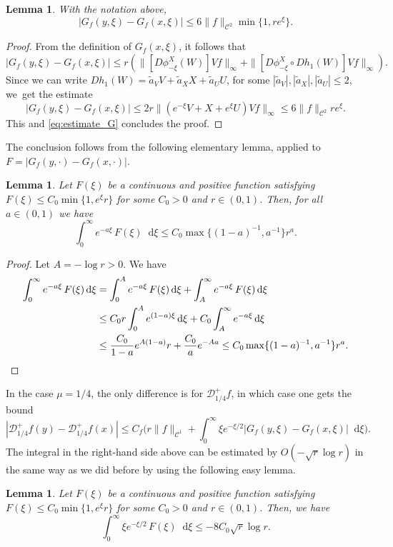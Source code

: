 \documentclass[JEP,XML,SOM,NoEqCountersInSection,Unicode,published]{cedram}
\newcommand*{\diff}{\mathop{}\!\mathrm{d}}
\newtheorem {lemma}[theorem]{Lemma}
\theoremstyle{definition}
\begin{document}
\begin{lemma}
With the notation above,
\[
|G_{f}(y,\xi) -G_{f}(x,\xi) |\leq 6 \|f\|_{\mathscr{C}^2} \min\{1, r e^\xi\}.
\]
\end{lemma}
\begin{proof}
From the definition of $G_{f}(x,\xi)$, it follows that
\[
|G_{f}(y,\xi) -G_{f}(x,\xi) |\leq r (\|[D\phi^X_{-\xi}(W) ] Vf \|_\infty + \|[D\phi^X_{-\xi} \circ Dh_1 (W)] Vf \|_\infty).
\]
Since we can write $Dh_1 (W) = {\widetilde a_V}V+{\widetilde a_X}X+{\widetilde a_U}U$, for some $|{\widetilde a_V}|, |{\widetilde a_X}|, |{\widetilde a_U}|\leq 2$, we~get the estimate
\[
|G_{f}(y,\xi) -G_{f}(x,\xi) |\leq 2 r \|(e^{-\xi}V + X + e^{\xi}U)Vf\|_\infty \leq 6 \|f\|_{\mathscr{C}^2} r e^\xi.
\]
This and \eqref{eq:estimate_G} concludes the proof.
\end{proof}

The conclusion follows from the following elementary lemma, applied to $F=|G_{f}(y, \cdot) - G_{f}(x, \cdot)|$.

\begin{lemma}
Let $F(\xi)$ be a continuous and positive function satisfying $F(\xi) \leq C_0 \min\{ 1, e^\xi r\}$ for some $C_0>0$ and $r \in (0,1)$. Then, for all $a\in (0,1)$ we have
\[
\int_0^\infty e^{-a \xi} \, F(\xi) \diff \xi \leq C_0 \max\{(1-a)^{-1}, a^{-1}\} r^a.
\]
\end{lemma}
\begin{proof}
Let $A = -\log r >0$. We have
\begin{align*}
\int_0^\infty e^{-a \xi} \, F(\xi) \diff \xi &= \int_0^A e^{-a \xi} \, F(\xi) \diff \xi + \int_A^{\infty} e^{-a \xi} \, F(\xi) \diff \xi \\
& \leq C_0 r \int_0^A e^{(1-a) \xi} \diff \xi + C_0 \int_A^{\infty} e^{-a \xi} \diff \xi \\
&\leq \frac{C_0}{1-a}e^{A(1-a)} r + \frac{C_0}{a} e^{-Aa} \leq C_0 \max\{(1-a)^{-1}, a^{-1}\} r^a.\qedhere
\end{align*}
\end{proof}

In the case $\mu=1/4$, the only difference is for $\mathcal{D}^{+}_{1/4}f$, in which case one gets the bound
\[
|\mathcal{D}^{+}_{1/4}f(y) - \mathcal{D}^{+}_{1/4}f(x)|\leq C_{f} \biggl(r \|f\|_{\mathscr{C}^1} + \int_0^{\infty} \xi e^{- \xi/2} |G_{f}(y,\xi) -G_{f}(x,\xi) |\diff \xi \biggr).
\]
The integral in the right-hand side above can be estimated by $O(-\sqrt{r} \log r)$ in the same way as we did before by using the following easy lemma.
\begin{lemma}
Let $F(\xi)$ be a continuous and positive function satisfying $F(\xi) \leq C_0 \min\{ 1, e^\xi r\}$ for some $C_0>0$ and $r \in (0,1)$. Then, we have
\[
\int_0^\infty \xi e^{- \xi/2} \, F(\xi) \diff \xi \leq -8C_0 \sqrt{r} \log r.
\]
\end{lemma}
\end{document}
